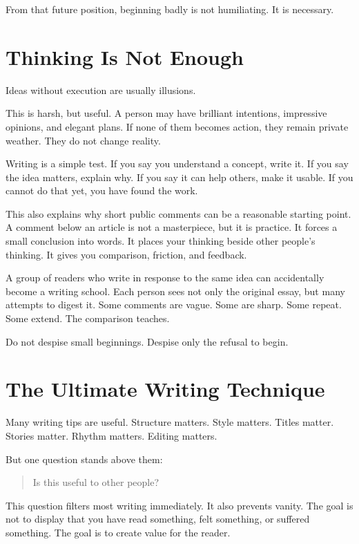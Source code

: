 From that future position, beginning badly is not humiliating. It is necessary.

\section*{Thinking Is Not Enough}

Ideas without execution are usually illusions.

This is harsh, but useful. A person may have brilliant intentions, impressive opinions, and elegant plans. If none of them becomes action, they remain private weather. They do not change reality.

Writing is a simple test. If you say you understand a concept, write it. If you say the idea matters, explain why. If you say it can help others, make it usable. If you cannot do that yet, you have found the work.

This also explains why short public comments can be a reasonable starting point. A comment below an article is not a masterpiece, but it is practice. It forces a small conclusion into words. It places your thinking beside other people's thinking. It gives you comparison, friction, and feedback.

A group of readers who write in response to the same idea can accidentally become a writing school. Each person sees not only the original essay, but many attempts to digest it. Some comments are vague. Some are sharp. Some repeat. Some extend. The comparison teaches.

Do not despise small beginnings. Despise only the refusal to begin.

\section*{The Ultimate Writing Technique}

Many writing tips are useful. Structure matters. Style matters. Titles matter. Stories matter. Rhythm matters. Editing matters.

But one question stands above them:

\begin{quote}
Is this useful to other people?
\end{quote}

This question filters most writing immediately. It also prevents vanity. The goal is not to display that you have read something, felt something, or suffered something. The goal is to create value for the reader.

